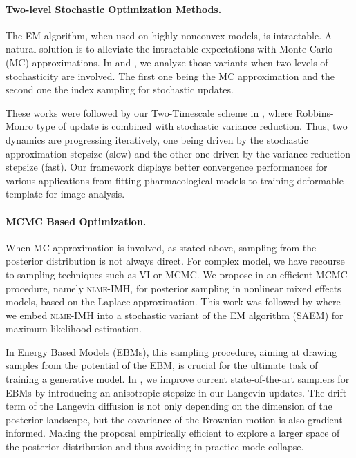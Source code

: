 \documentclass[twoside,11pt]{article}
\begin{document}
\vspace{0.08in}
\paragraph{Two-level Stochastic Optimization Methods.} 
The EM algorithm, when used on highly nonconvex models, is intractable.
A natural solution is to alleviate the intractable expectations with Monte Carlo (MC) approximations.
In \citep{karimi2019convergence} and \citep{karimi2020misso}, we analyze those variants when two levels of stochasticity are involved.
The first one being the MC approximation and the second one the index sampling for stochastic updates.

These works were followed by our Two-Timescale scheme in \citep{karimi2020tts}, where Robbins-Monro type of update is combined with stochastic variance reduction.
Thus, two dynamics are progressing iteratively, one being driven by the stochastic approximation stepsize (slow) and the other one driven by the variance reduction stepsize (fast).
Our framework displays better convergence performances for various applications from fitting pharmacological models to training deformable template for image analysis.

\vspace{0.08in}
\paragraph{MCMC Based Optimization.} 

When MC approximation is involved, as stated above, sampling from the posterior distribution is not always direct.
For complex model, we have recourse to sampling techniques such as VI or MCMC.
We propose in \citep{karimi2017non, karimi2018eff} an efficient MCMC procedure, namely \textsc{nlme-IMH}, for posterior sampling in nonlinear mixed effects models, based on the Laplace approximation.
This work was followed by \citep{karimi2018fsaem} where we embed \textsc{nlme-IMH} into a stochastic variant of the EM algorithm (SAEM) for maximum likelihood estimation.

In Energy Based Models (EBMs), this sampling procedure, aiming at drawing samples from the potential of the EBM, is crucial for the ultimate task of training a generative model.
In \citep{karimi2020anila}, we improve current state-of-the-art samplers for EBMs by introducing an anisotropic stepsize in our Langevin updates.
The drift term of the Langevin diffusion is not only depending on the dimension of the posterior landscape, but the covariance of the Brownian motion is also gradient informed. 
Making the proposal empirically efficient to explore a larger space of the posterior distribution and thus avoiding in practice mode collapse.
\end{document}
